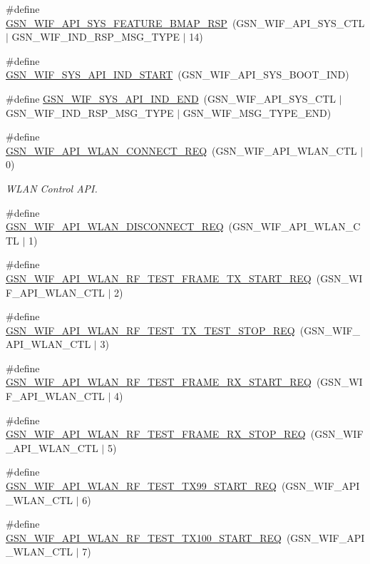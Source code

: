 \begin{DoxyCompactItemize}
\item 
\#define \hyperlink{a00606_a29c102b36af712416a8dcb56e95ddc8f}{GSN\_\-WIF\_\-API\_\-SYS\_\-FEATURE\_\-BMAP\_\-RSP}~(GSN\_\-WIF\_\-API\_\-SYS\_\-CTL $|$ GSN\_\-WIF\_\-IND\_\-RSP\_\-MSG\_\-TYPE $|$ 14)
\item 
\#define \hyperlink{a00606_a4dfac5bd144fa9e23e0389182df89716}{GSN\_\-WIF\_\-SYS\_\-API\_\-IND\_\-START}~(GSN\_\-WIF\_\-API\_\-SYS\_\-BOOT\_\-IND)
\item 
\#define \hyperlink{a00606_a4b084ace5b4394d9dfbd5f15515942ba}{GSN\_\-WIF\_\-SYS\_\-API\_\-IND\_\-END}~(GSN\_\-WIF\_\-API\_\-SYS\_\-CTL $|$ GSN\_\-WIF\_\-IND\_\-RSP\_\-MSG\_\-TYPE $|$ GSN\_\-WIF\_\-MSG\_\-TYPE\_\-END)
\item 
\#define \hyperlink{a00636_ga807417e493752092e13b44e6f31b896e}{GSN\_\-WIF\_\-API\_\-WLAN\_\-CONNECT\_\-REQ}~(GSN\_\-WIF\_\-API\_\-WLAN\_\-CTL $|$ 0)
\begin{DoxyCompactList}\small\item\em WLAN Control API. \end{DoxyCompactList}\item 
\#define \hyperlink{a00606_a000d192d1af36858dbc749f275d21d9a}{GSN\_\-WIF\_\-API\_\-WLAN\_\-DISCONNECT\_\-REQ}~(GSN\_\-WIF\_\-API\_\-WLAN\_\-CTL $|$ 1)
\item 
\#define \hyperlink{a00606_aaec020519f654d34567226449b0a872b}{GSN\_\-WIF\_\-API\_\-WLAN\_\-RF\_\-TEST\_\-FRAME\_\-TX\_\-START\_\-REQ}~(GSN\_\-WIF\_\-API\_\-WLAN\_\-CTL $|$ 2)
\item 
\#define \hyperlink{a00606_ab5ae3873d5429c2f2aba1d7db6fe1b34}{GSN\_\-WIF\_\-API\_\-WLAN\_\-RF\_\-TEST\_\-TX\_\-TEST\_\-STOP\_\-REQ}~(GSN\_\-WIF\_\-API\_\-WLAN\_\-CTL $|$ 3)
\item 
\#define \hyperlink{a00606_acd5783286a3f99614a8e2cf2524484ac}{GSN\_\-WIF\_\-API\_\-WLAN\_\-RF\_\-TEST\_\-FRAME\_\-RX\_\-START\_\-REQ}~(GSN\_\-WIF\_\-API\_\-WLAN\_\-CTL $|$ 4)
\item 
\#define \hyperlink{a00606_afc6cc44ba2e03d4d2ccf0da923c61bd3}{GSN\_\-WIF\_\-API\_\-WLAN\_\-RF\_\-TEST\_\-FRAME\_\-RX\_\-STOP\_\-REQ}~(GSN\_\-WIF\_\-API\_\-WLAN\_\-CTL $|$ 5)
\item 
\#define \hyperlink{a00606_add9a75e673355731d98ddb52d8e969a4}{GSN\_\-WIF\_\-API\_\-WLAN\_\-RF\_\-TEST\_\-TX99\_\-START\_\-REQ}~(GSN\_\-WIF\_\-API\_\-WLAN\_\-CTL $|$ 6)
\item 
\#define \hyperlink{a00606_a15863aea319457dd89e563953224c2a8}{GSN\_\-WIF\_\-API\_\-WLAN\_\-RF\_\-TEST\_\-TX100\_\-START\_\-REQ}~(GSN\_\-WIF\_\-API\_\-WLAN\_\-CTL $|$ 7)

\end{DoxyCompactItemize}
